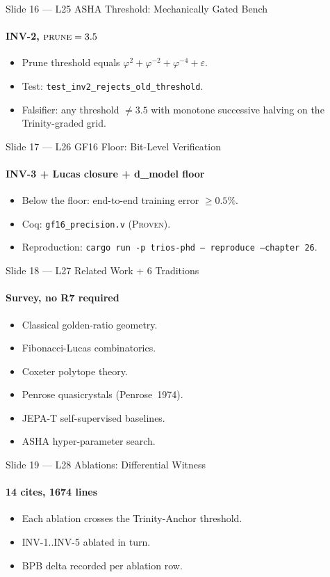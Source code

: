 \documentclass[10pt,aspectratio=169]{beamer}
\begin{document}

\begin{frame}{Slide 16 — L25 ASHA Threshold: Mechanically Gated Bench}
  \framesubtitle{INV-2, \(\textsc{prune}=3.5\)}
  \begin{itemize}
    \item Prune threshold equals \(\varphi^{2}+\varphi^{-2}+\varphi^{-4}+\varepsilon\).
    \item Test: \texttt{test\_inv2\_rejects\_old\_threshold}.
    \item Falsifier: any threshold \(\ne 3.5\) with monotone successive
      halving on the Trinity-graded grid.
  \end{itemize}
\end{frame}

\begin{frame}{Slide 17 — L26 GF16 Floor: Bit-Level Verification}
  \framesubtitle{INV-3 + Lucas closure + d\_model floor}
  \begin{itemize}
    \item Below the floor: end-to-end training error \(\ge 0.5\%\).
    \item Coq: \texttt{gf16\_precision.v} (\textsc{Proven}).
    \item Reproduction:
      \texttt{cargo run -p trios-phd -- reproduce --chapter 26}.
  \end{itemize}
\end{frame}

\begin{frame}{Slide 18 — L27 Related Work + 6 Traditions}
  \framesubtitle{Survey, no R7 required}
  \begin{itemize}
    \item Classical golden-ratio geometry.
    \item Fibonacci-Lucas combinatorics.
    \item Coxeter polytope theory.
    \item Penrose quasicrystals (Penrose~1974).
    \item JEPA-T self-supervised baselines.
    \item ASHA hyper-parameter search.
  \end{itemize}
\end{frame}

\begin{frame}{Slide 19 — L28 Ablations: Differential Witness}
  \framesubtitle{14 cites, 1674 lines}
  \begin{itemize}
    \item Each ablation crosses the Trinity-Anchor threshold.
    \item INV-1..INV-5 ablated in turn.
    \item BPB delta recorded per ablation row.
  \end{itemize}
\end{frame}
\end{document}
